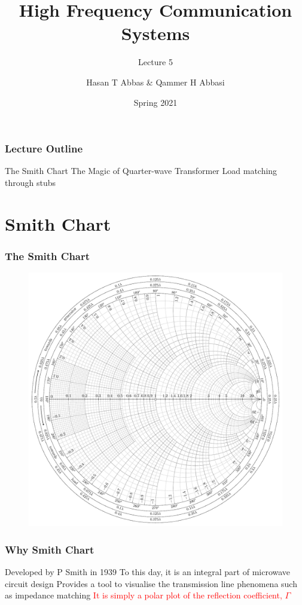 \documentclass[10pt, compress]{beamer}
\title{High Frequency Communication Systems}
\subtitle{Lecture 5}
\date{Spring 2021}
\author{Hasan T Abbas \& Qammer H Abbasi}
\begin{document}
\maketitle

\begin{frame}[fragile]
    \frametitle{Lecture Outline}
    \begin{outline}[itemize]
        \1 The Smith Chart
        \1 The Magic of Quarter-wave Transformer
        \1 Load matching through stubs
    \end{outline}
\end{frame}

\section{Smith Chart}


\begin{frame}
    \frametitle{The Smith Chart}
    \begin{figure}[htbp]
        \centering
        \includegraphics[width=.7\textwidth]{smith.pdf}
    \end{figure}
\end{frame}


\begin{frame}
    \frametitle{Why Smith Chart}
    \begin{outline}
        \1 Developed by P Smith in 1939
        \1 To this day, it is an integral part of microwave circuit design
        \1 Provides a tool to visualise the transmission line phenomena such as impedance matching
        \1 \textcolor{red}{It is simply a polar plot of the reflection coefficient, $\Gamma$}
    \end{outline}
\end{frame}
\end{document}
